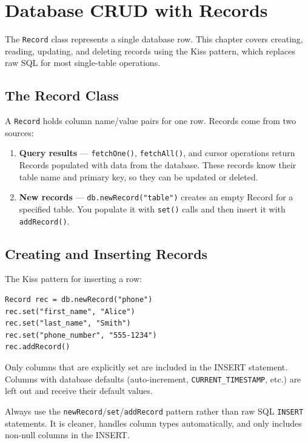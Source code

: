 \chapter{Database CRUD with Records}
\label{ch:db-crud}

The \texttt{Record} class represents a single database row.  This chapter covers creating, reading, updating, and deleting records using the Kiss pattern, which replaces raw SQL for most single-table operations.

\section{The Record Class}
\label{sec:crud-record}

A \texttt{Record} holds column name/value pairs for one row.  Records come from two sources:

\begin{enumerate}
  \item \textbf{Query results} --- \texttt{fetchOne()}, \texttt{fetchAll()}, and cursor operations return Records populated with data from the database.  These records know their table name and primary key, so they can be updated or deleted.
  \item \textbf{New records} --- \texttt{db.newRecord("table")} creates an empty Record for a specified table.  You populate it with \texttt{set()} calls and then insert it with \texttt{addRecord()}.
\end{enumerate}

\section{Creating and Inserting Records}
\label{sec:crud-insert}

The Kiss pattern for inserting a row:

\begin{lstlisting}[style=groovy]
Record rec = db.newRecord("phone")
rec.set("first_name", "Alice")
rec.set("last_name", "Smith")
rec.set("phone_number", "555-1234")
rec.addRecord()
\end{lstlisting}

\noindent
Only columns that are explicitly set are included in the INSERT statement.  Columns with database defaults (auto-increment, \texttt{CURRENT\_TIMESTAMP}, etc.) are left out and receive their default values.

\begin{notebox}
Always use the \texttt{newRecord}/\texttt{set}/\texttt{addRecord} pattern rather than raw SQL \texttt{INSERT} statements.  It is cleaner, handles column types automatically, and only includes non-null columns in the INSERT.
\end{notebox}

